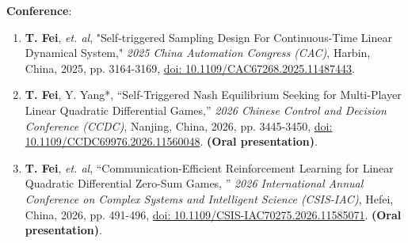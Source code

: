 \documentclass[a4paper,11pt]{article}
\begin{document}
\begin{itemize}[leftmargin=0in, label={}]
  \small{\item{\textbf{Conference}:}}
  \begin{enumerate}[leftmargin=0.24in, start=7]
  	\item \small{\textbf{T. Fei}, \textit{et. al}, "Self-triggered Sampling Design For Continuous-Time Linear Dynamical System," \textit{2025 China Automation Congress (CAC)}, Harbin, China, 2025, pp. 3164-3169, \href{https://ieeexplore.ieee.org/document/11487443}{doi: 10.1109/CAC67268.2025.11487443}.}
  	
  	\item \small{\textbf{T. Fei}, Y. Yang*, “Self-Triggered Nash Equilibrium Seeking for Multi-Player Linear Quadratic Differential Games,” \textit{2026 Chinese Control and Decision Conference (CCDC)}, Nanjing, China, 2026, pp. 3445-3450,  \href{https://ieeexplore.ieee.org/document/11560048}{doi: 10.1109/CCDC69976.2026.11560048}. \textbf{(Oral presentation)}.}
  	
  	\item \small{\textbf{T. Fei}, \textit{et. al}, “Communication-Efficient Reinforcement Learning for Linear Quadratic Differential Zero-Sum Games, ” \textit{2026 International Annual Conference on Complex Systems and Intelligent Science (CSIS-IAC)}, Hefei, China, 2026, pp. 491-496, \href{https://ieeexplore.ieee.org/document/11585071}{doi: 10.1109/CSIS-IAC70275.2026.11585071}. \textbf{(Oral presentation)}.}
  \end{enumerate}
\end{itemize}
\end{document}
